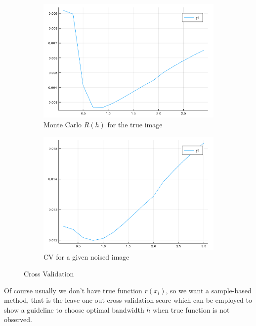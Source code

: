\documentclass{article}
\begin{document}
\begin{figure}[htb]
  \centering
  \begin{subfigure}[b]{0.49\linewidth}
    \includegraphics[width=\linewidth]{images/crossvalidation1.png}
    \caption{Monte Carlo $R(h)$ for the true image}
    \label{fig:crossvalidation_mc}
  \end{subfigure}
  \begin{subfigure}[b]{0.49\linewidth}
    \includegraphics[width=\linewidth]{images/crossvalidation2.png}
    \caption{CV for a given noised image}
    \label{fig:crossvalidation_cv}
  \end{subfigure}
  \caption{Cross Validation}
  \label{fig:crossvalidation}
\end{figure}

Of course usually we don't have true function $r(x_i)$, so we want a sample-based method, 
that is the leave-one-out cross validation score which can be employed to show a guideline to choose optimal bandwidth $h$
when true function is not observed.
\end{document}
